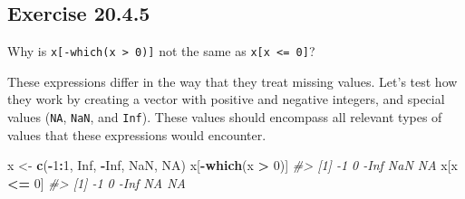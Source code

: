 \documentclass[]{book}
\newenvironment{Shaded}{\begin{snugshade}}{\end{snugshade}}
\newcommand{\CommentTok}[1]{\textcolor[rgb]{0.56,0.35,0.01}{\textit{#1}}}
\newcommand{\ControlFlowTok}[1]{\textcolor[rgb]{0.13,0.29,0.53}{\textbf{#1}}}
\newcommand{\DecValTok}[1]{\textcolor[rgb]{0.00,0.00,0.81}{#1}}
\newcommand{\KeywordTok}[1]{\textcolor[rgb]{0.13,0.29,0.53}{\textbf{#1}}}
\newcommand{\NormalTok}[1]{#1}
\newcommand{\OperatorTok}[1]{\textcolor[rgb]{0.81,0.36,0.00}{\textbf{#1}}}
\newcommand{\OtherTok}[1]{\textcolor[rgb]{0.56,0.35,0.01}{#1}}
\newcommand{\StringTok}[1]{\textcolor[rgb]{0.31,0.60,0.02}{#1}}
\theoremstyle{plain}
\theoremstyle{remark}
\begin{document}
\begin{enumerate}
\begin{Shaded}
\end{Shaded}
\end{enumerate}

\hypertarget{exercise-20.4.5}{%
\subsection*{\texorpdfstring{Exercise
{20.4.5}}{Exercise 20.4.5}}\label{exercise-20.4.5}}

Why is \texttt{x{[}-which(x\ \textgreater{}\ 0){]}} not the same as
\texttt{x{[}x\ \textless{}=\ 0{]}}?

These expressions differ in the way that they treat missing values.
Let's test how they work by creating a vector with positive and negative
integers, and special values (\texttt{NA}, \texttt{NaN}, and
\texttt{Inf}). These values should encompass all relevant types of
values that these expressions would encounter.

\begin{Shaded}
\begin{Highlighting}[]
\NormalTok{x <-}\StringTok{ }\KeywordTok{c}\NormalTok{(}\OperatorTok{-}\DecValTok{1}\OperatorTok{:}\DecValTok{1}\NormalTok{, }\OtherTok{Inf}\NormalTok{, }\OperatorTok{-}\OtherTok{Inf}\NormalTok{, }\OtherTok{NaN}\NormalTok{, }\OtherTok{NA}\NormalTok{)}
\NormalTok{x[}\OperatorTok{-}\KeywordTok{which}\NormalTok{(x }\OperatorTok{>}\StringTok{ }\DecValTok{0}\NormalTok{)]}
\CommentTok{#> [1]   -1    0 -Inf  NaN   NA}
\NormalTok{x[x }\OperatorTok{<=}\StringTok{ }\DecValTok{0}\NormalTok{]}
\CommentTok{#> [1]   -1    0 -Inf   NA   NA}
\end{Highlighting}
\end{Shaded}
\end{document}
